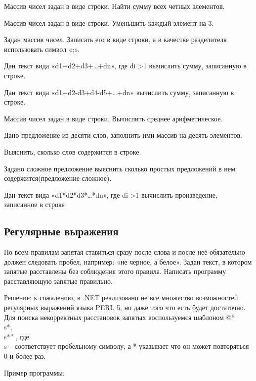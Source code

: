 \task Массив чисел задан в виде строки. Найти сумму всех четных
элементов.

\task Массив чисел задан в виде строки. Уменьшить каждый элемент на 3.

\task Задан массив чисел. Записать его в виде строки, а в качестве
разделителя использовать символ «;».

\task Дан текст вида «d1+d2+d3+…+dn», где di >1 вычислить сумму,
записанную в строке.

\task Дан текст вида «d1+d2-d3+d4-d5+…+dn» вычислить сумму, записанную
в строке.

\task Массив чисел задан в виде строки. Вычислить среднее
арифметическое.

\task Дано предложение из десяти слов, заполнить ими массив на десять
элементов.

\task Выяснить, сколько слов содержится в строке.

\task Задано сложное предложение выяснить сколько простых предложений
в нем содержится(предложение сложное).

\task Дан текст вида «d1*d2*d3*…*dn», где di >1 вычислить
произведение, записанное в строке

\subsection{Регулярные выражения}

По всем правилам запятая ставиться сразу после слова и после неё
обязательно должен следовать пробел, например: «не черное, а
  белое». Задан текст, в котором запятые расставлены без соблюдения
этого правила. Написать программу расставляющую запятые правильно.

Решение: к сожалению, в .NET реализовано не все множество возможностей
регулярных выражений языка PERL 5, но даже того что есть будет
достаточно. Для поиска некорректных расстановок запятых воспользуемся
шаблоном @“\\s*,\\s*” , где \\s – соответствует пробельному символу, а *
указывает что он может повторяться 0 и более раз.

Пример программы:



